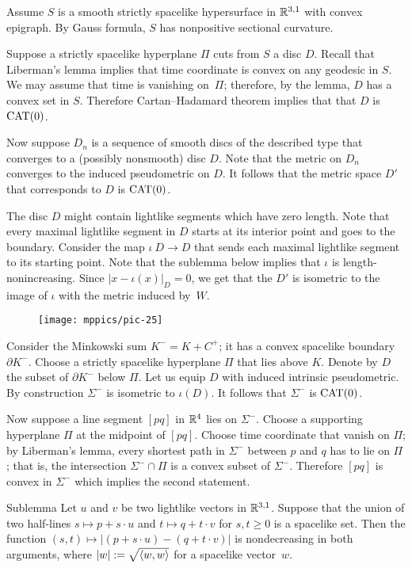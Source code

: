 \documentclass{article}
\begin{document}
Assume $S$ is a smooth strictly spacelike hypersurface in $\mathbb{R}^{3,1}$ with convex epigraph.
By Gauss formula, $S$ has nonpositive sectional curvature.

Suppose a strictly spacelike hyperplane $\Pi$ cuts from $S$ a disc $D$.
Recall that Liberman's lemma \cite[Theorem~3]{milka} implies that time coordinate is convex on any geodesic in $S$.
We may assume that time is vanishing on~$\Pi$;
therefore, by the lemma, $D$ has a convex set in $S$.
Therefore Cartan--Hadamard theorem \cite{alexander-kapovitch-petrunin-2021} implies that that $D$ is $\mathrm{CAT}(0)$.

Now suppose $D_n$ is a sequence of smooth discs of the described type that converges to a (possibly nonsmooth) disc $D$.
Note that the metric on $D_n$ converges to the induced pseudometric on $D$.
It follows that the metric space $D'$ that corresponds to $D$ is $\mathrm{CAT}(0)$.

The disc $D$ might contain lightlike segments which have zero length.
Note that every maximal lightlike segment in $D$ starts at its interior point and goes to the boundary.
Consider the map $\iota\:D\to D$ that sends each maximal lightlike segment to its starting point.
Note that the sublemma below implies that $\iota$ is length-nonincreasing.
Since $|x-\iota(x)|_D=0$, we get that the $D'$ is isometric to the image of $\iota$ with the metric induced by~$W$.

\begin{wrapfigure}{r}{61mm}
\vskip-0mm
\centering
\texttt{[image: mppics/pic-25]}
\end{wrapfigure}

Consider the Minkowski sum $K^-=K+C^+$;
it has a convex spacelike boundary $\partial K^-$.
Choose a strictly spacelike hyperplane $\Pi$ that lies above $K$.
Denote by $D$ the subset of $\partial K^-$ below $\Pi$.
Let us equip $D$ with induced intrinsic pseudometric.
By construction $\Sigma^-$ is isometric to $\iota(D)$.
It follows that $\Sigma^-$ is $\mathrm{CAT}(0)$. 

Now suppose a line segment $[pq]$ in $\mathbb{R}^4$ 
lies on $\Sigma^-$.
Choose a supporting hyperplane $\Pi$ at the midpoint of $[pq]$.
Choose time coordinate that vanish on $\Pi$;
by Liberman's lemma, every shortest path in $\Sigma^-$ between $p$ and $q$ has to lie on $\Pi$;
that is, the intersection $\Sigma^-\cap \Pi$ is a convex subset of $\Sigma^-$.
Therefore $[pq]$ is convex in $\Sigma^-$ which implies the second statement.
\qeds


\begin{thm}{Sublemma}
Let $u$ and $v$ be two lightlike vectors in $\mathbb{R}^{3,1}$.
Suppose that the union of two half-lines $s\mapsto p+s\cdot u$ and $t\mapsto q+t\cdot v$ for $s,t\ge 0$ is a spacelike set.
Then the function 
$(s,t)\mapsto |(p+s\cdot u)-(q+t\cdot v)|$
is nondecreasing in both arguments,
where $|w|\mathrel{:=}\sqrt{\langle w,w\rangle}$ for a spacelike vector~$w$.
\end{thm}
\end{document}
